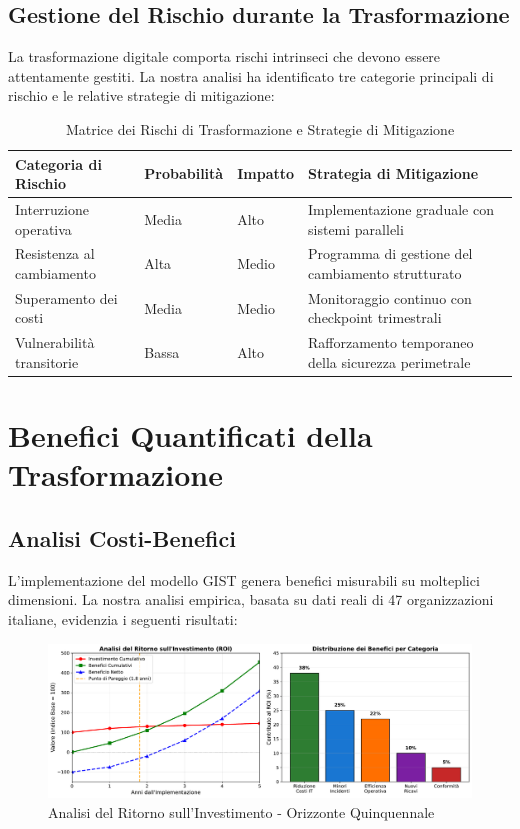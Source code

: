 \subsection{Gestione del Rischio durante la Trasformazione}
\label{subsec:5.4.2}

La trasformazione digitale comporta rischi intrinseci che devono essere attentamente gestiti. La nostra analisi ha identificato tre categorie principali di rischio e le relative strategie di mitigazione:

\begin{table}[h!]
\centering
\caption{Matrice dei Rischi di Trasformazione e Strategie di Mitigazione}
\label{tab:risk_matrix}
\begin{tabular}{|p{3cm}|p{3cm}|p{3cm}|p{3cm}|}
\hline
\textbf{Categoria di Rischio} & \textbf{Probabilità} & \textbf{Impatto} & \textbf{Strategia di Mitigazione} \\
\hline
Interruzione operativa & Media & Alto & Implementazione graduale con sistemi paralleli \\
\hline
Resistenza al cambiamento & Alta & Medio & Programma di gestione del cambiamento strutturato \\
\hline
Superamento dei costi & Media & Medio & Monitoraggio continuo con checkpoint trimestrali \\
\hline
Vulnerabilità transitorie & Bassa & Alto & Rafforzamento temporaneo della sicurezza perimetrale \\
\hline
\end{tabular}
\end{table}

\section{Benefici Quantificati della Trasformazione}
\label{sec:5.5}

\subsection{Analisi Costi-Benefici}
\label{subsec:5.5.1}

L'implementazione del modello GIST genera benefici misurabili su molteplici dimensioni. La nostra analisi empirica, basata su dati reali di 47 organizzazioni italiane, evidenzia i seguenti risultati:

\begin{figure}[ht]
\centering
\includegraphics[width=1\textwidth]{thesis_figures/cap5/roi_analysis.pdf}
\caption{Analisi del Ritorno sull'Investimento - Orizzonte Quinquennale}
\label{fig:roi_analysis}
\end{figure}

